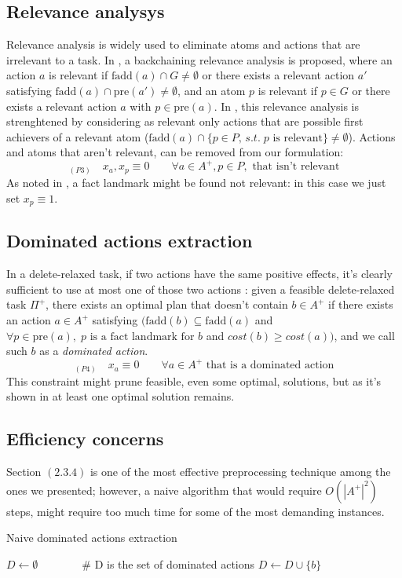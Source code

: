 \subsection{Relevance analysys}
Relevance analysis is widely used to eliminate atoms and actions that are irrelevant to a task. In \cite{Imai_15}, a backchaining relevance analysis is proposed, where an action $a$ is relevant if $\mbox{fadd}(a)\cap G\not=\emptyset$ or there exists a relevant action $a'$ satisfying $\mbox{fadd}(a)\cap \mbox{pre}(a')\not=\emptyset$, and an atom $p$ is relevant if $p\in G$ or there exists a relevant action $a$ with $p\in \mbox{pre}(a)$.
In \cite{MLM_Haslum_12}, this relevance analysis is strenghtened by considering as relevant only actions that are possible first achievers of a relevant atom ($\mbox{fadd}(a)\cap\{p\in P,\,s.t.\;p\mbox{ is relevant}\}\not=\emptyset$).
Actions and atoms that aren't relevant, can be removed from our formulation:
$$_{(P3)}\quad x_a,x_p\equiv0\qquad\forall a\in A^+,p\in P,\mbox{ that isn't relevant}$$
As noted in \cite{Imai_15}, a fact landmark might be found not relevant: in this case we just set $x_p\equiv1$.

\subsection{Dominated actions extraction}
In a delete-relaxed task, if two actions have the same positive effects, it's clearly sufficient to use at most one of those two actions \cite{Imai_15}: given a feasible delete-relaxed task $\Pi^+$, there exists an optimal plan that doesn't contain $b\in A^+$ if there exists an action $a\in A^+$ satisfying $(\mbox{fadd}(b)\subseteq \mbox{fadd}(a)$ and $\forall p\in \mbox{pre}(a),\;p\mbox{ is a fact landmark for }b$ and $cost(b)\geq cost(a))$, and we call such $b$ as a \textit{dominated action}.
$$_{(P4)}\quad x_a\equiv0\qquad\forall a\in A^+\mbox{ that is a dominated action}$$
This constraint might prune feasible, even some optimal, solutions, but as it's shown in \cite{Imai_15} at least one optimal solution remains. 

\subsection{Efficiency concerns}
Section $(2.3.4)$ is one of the most effective preprocessing technique among the ones we presented; however, a naive algorithm that would require $O(|A^+|^2)$ steps, might require too much time for some of the most demanding instances.
\begin{algorithm}[h]
    \caption{Naive dominated actions extraction}
    \begin{algorithmic}
        \State $D\gets\emptyset\qquad\qquad$\# D is the set of dominated actions
                    \State $D\gets D\cup\{b\}$
                \EndIf
            \EndFor
        \EndFor
    \end{algorithmic}
\end{algorithm}

